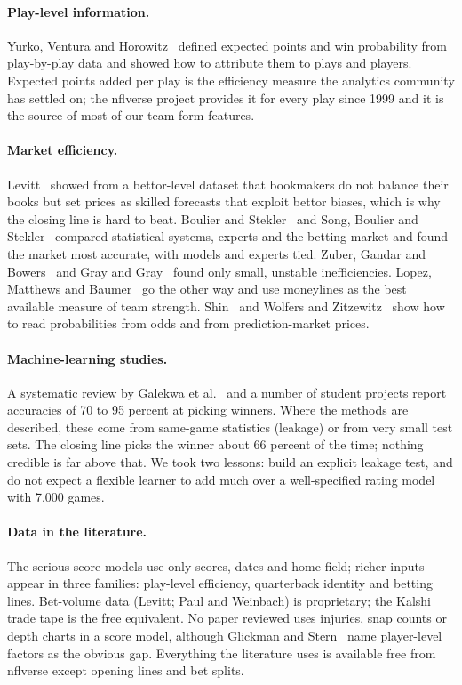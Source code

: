 \paragraph{Play-level information.} Yurko, Ventura and Horowitz~\cite{yurko2019} defined expected points and win probability from play-by-play data and showed how to attribute them to plays and players. Expected points added per play is the efficiency measure the analytics community has settled on; the nflverse project provides it for every play since 1999 and it is the source of most of our team-form features.

\paragraph{Market efficiency.} Levitt~\cite{levitt2004} showed from a bettor-level dataset that bookmakers do not balance their books but set prices as skilled forecasts that exploit bettor biases, which is why the closing line is hard to beat. Boulier and Stekler~\cite{boulierstekler2003} and Song, Boulier and Stekler~\cite{songboulierstekler2007} compared statistical systems, experts and the betting market and found the market most accurate, with models and experts tied. Zuber, Gandar and Bowers~\cite{zuber1985} and Gray and Gray~\cite{graygray1997} found only small, unstable inefficiencies. Lopez, Matthews and Baumer~\cite{lopez2018} go the other way and use moneylines as the best available measure of team strength. Shin~\cite{shin1993} and Wolfers and Zitzewitz~\cite{wolferszitzewitz2006} show how to read probabilities from odds and from prediction-market prices.

\paragraph{Machine-learning studies.} A systematic review by Galekwa et al.~\cite{mlreview2024} and a number of student projects report accuracies of 70 to 95 percent at picking winners. Where the methods are described, these come from same-game statistics (leakage) or from very small test sets. The closing line picks the winner about 66 percent of the time; nothing credible is far above that. We took two lessons: build an explicit leakage test, and do not expect a flexible learner to add much over a well-specified rating model with 7,000 games.

\paragraph{Data in the literature.} The serious score models use only scores, dates and home field; richer inputs appear in three families: play-level efficiency, quarterback identity and betting lines. Bet-volume data (Levitt; Paul and Weinbach) is proprietary; the Kalshi trade tape is the free equivalent. No paper reviewed uses injuries, snap counts or depth charts in a score model, although Glickman and Stern~\cite{glickmanstern2017} name player-level factors as the obvious gap. Everything the literature uses is available free from nflverse except opening lines and bet splits.


